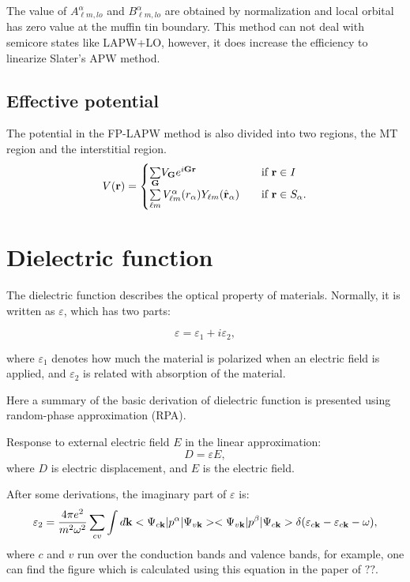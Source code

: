 \documentclass[a4paper, 12pt, titlepage,oneside,drop]{kthesis}
\begin{document}
The value of $A _{{\ell}m,lo}^{\alpha}$ and $B _{{\ell}m,lo}^{\alpha}$ are obtained by normalization and local orbital has zero value at the muffin tin boundary. This method can not deal with semicore states like LAPW+LO, 
however, it does increase the efficiency to linearize Slater's APW method.

\subsection{Effective potential}

\label{epote}
The potential in the FP-LAPW method is also divided into two regions, the MT region and the interstitial region.
\begin{equation*}\label{lap7}
V(\textbf{r})= 
\begin{cases} \sumg<{\textbf G}> V_{\textbf G} e^{i {\textbf G} {\textbf {r}  }} & \quad \mbox{if $\textbf{r} \in I $}
\\
 \sum\limits_{{\ell}m} V_{{\ell}m}^{\alpha} (r_{\alpha}) Y_{{\ell}m}(\hat{{\textbf r}}_{\alpha})  & \quad \mbox{if $\textbf{r} \in S_\alpha. $}\\ 
\end{cases}
\end{equation*}

\section{Dielectric function}
The dielectric function describes the optical property of materials. Normally, it is written as $\varepsilon$, which has two parts:

\begin{equation}
 \varepsilon = \varepsilon_1 + i \varepsilon_2,
\end{equation}

where $\varepsilon_1$ denotes how much the material is polarized when an electric field is applied, and $\varepsilon_2$ is related with absorption of the material.

Here a summary of the basic derivation of dielectric function is presented using random-phase approximation (RPA).

Response to external electric field $E$ in the linear approximation:
\begin{equation}\label{df1}
D = \varepsilon E,
\end{equation}
where $D$ is electric displacement, and $E$ is the electric field.

After some derivations, the imaginary part of $\varepsilon$ is:
\begin{equation}\label{df2}
\varepsilon_2 = \frac{4 \pi e^2}{m^2\omega^2} \sum_{cv} \int d \textbf {k} <\Psi_{c{\textbf k}}|p^\alpha|\Psi_{v{\textbf k}}><\Psi_{v{\textbf k}}|p^\beta|\Psi_{c{\textbf k}}>\delta(\varepsilon_{c {\textbf k}}-\varepsilon_{c{\textbf k}}-\omega),
\end{equation}
where $c$ and $v$ run over the conduction bands and valence bands, for example, one can find the figure which is calculated using this equation in the paper of $??$.
\end{document}
